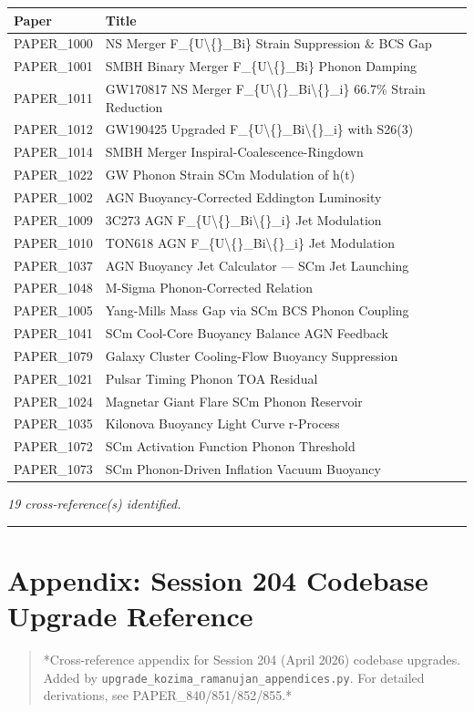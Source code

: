 \documentclass[11pt]{article}
\begin{document}
\begin{center}
\begin{longtable}{ll}
\toprule
Paper & Title \tabularnewline
\midrule
\endhead
PAPER\_1000 & NS Merger F\_\{U\textbackslash\{\}\_Bi\} Strain Suppression \& BCS Gap \tabularnewline
PAPER\_1001 & SMBH Binary Merger F\_\{U\textbackslash\{\}\_Bi\} Phonon Damping \tabularnewline
PAPER\_1011 & GW170817 NS Merger F\_\{U\textbackslash\{\}\_Bi\textbackslash\{\}\_i\} 66.7\% Strain Reduction \tabularnewline
PAPER\_1012 & GW190425 Upgraded F\_\{U\textbackslash\{\}\_Bi\textbackslash\{\}\_i\} with S26(3) \tabularnewline
PAPER\_1014 & SMBH Merger Inspiral-Coalescence-Ringdown \tabularnewline
PAPER\_1022 & GW Phonon Strain SCm Modulation of h(t) \tabularnewline
PAPER\_1002 & AGN Buoyancy-Corrected Eddington Luminosity \tabularnewline
PAPER\_1009 & 3C273 AGN F\_\{U\textbackslash\{\}\_Bi\textbackslash\{\}\_i\} Jet Modulation \tabularnewline
PAPER\_1010 & TON618 AGN F\_\{U\textbackslash\{\}\_Bi\textbackslash\{\}\_i\} Jet Modulation \tabularnewline
PAPER\_1037 & AGN Buoyancy Jet Calculator --- SCm Jet Launching \tabularnewline
PAPER\_1048 & M-Sigma Phonon-Corrected Relation \tabularnewline
PAPER\_1005 & Yang-Mills Mass Gap via SCm BCS Phonon Coupling \tabularnewline
PAPER\_1041 & SCm Cool-Core Buoyancy Balance AGN Feedback \tabularnewline
PAPER\_1079 & Galaxy Cluster Cooling-Flow Buoyancy Suppression \tabularnewline
PAPER\_1021 & Pulsar Timing Phonon TOA Residual \tabularnewline
PAPER\_1024 & Magnetar Giant Flare SCm Phonon Reservoir \tabularnewline
PAPER\_1035 & Kilonova Buoyancy Light Curve r-Process \tabularnewline
PAPER\_1072 & SCm Activation Function Phonon Threshold \tabularnewline
PAPER\_1073 & SCm Phonon-Driven Inflation Vacuum Buoyancy \tabularnewline
\bottomrule
\end{longtable}
\end{center}

\emph{19 cross-reference(s) identified.}

\noindent\rule{\textwidth}{0.4pt}

\section*{Appendix: Session 204 Codebase Upgrade Reference}

\begin{quote}
*Cross-reference appendix for Session 204 (April 2026) codebase upgrades.
Added by \verb|upgrade_kozima_ramanujan_appendices.py|. For detailed derivations,
see PAPER\_840/851/852/855.*
\end{quote}
\end{document}
